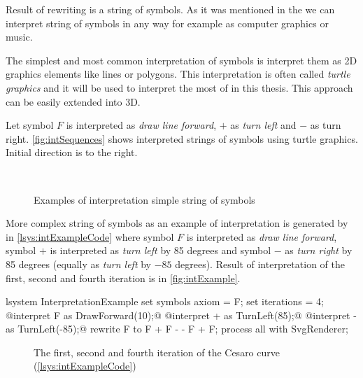 Result of \lsystem rewriting is a string of symbols.
As it was mentioned in the  we can interpret string of symbols in any way for example as computer graphics or music.

The simplest and most common interpretation of \lsystem symbols is interpret them as 2D graphics elements like lines or polygons.
This interpretation is often called \emph{turtle graphics} and it will be used to interpret the most of \lsystems in this thesis.
This approach can be easily extended into 3D.

Let symbol $F$ is interpreted as \emph{draw line forward}, $+$ as \emph{turn left} and $-$ as turn right.
\autoref{fig:intSequences} shows interpreted strings of symbols using turtle graphics.
Initial direction is to the right.

\begin{figure}[h]
	\centering
	 ~
	 ~
	\caption{Examples of interpretation simple string of symbols}
	\label{fig:intSequences}
\end{figure}


More complex string of symbols as an example of interpretation is generated by \lsystem in \autoref{lsys:intExampleCode} where symbol $F$ is interpreted as \emph{draw line forward},
	symbol $+$ is interpreted as \emph{turn left} by 85 degrees and symbol $-$ as \emph{turn right} by 85 degrees (equally as \emph{turn left} by $-85$ degrees).
Result of interpretation of the first, second and fourth iteration is in \autoref{fig:intExample}.

\begin{Lsystem}[label=lsys:intExampleCode,caption={Symbol interpretation example}]
lsystem InterpretationExample {
	set symbols axiom = F;
	set iterations = 4;
	@interpret F as DrawForward(10);@
	@interpret + as TurnLeft(85);@
	@interpret - as TurnLeft(-85);@
	rewrite F to F + F - - F + F;
}
process all with SvgRenderer;
\end{Lsystem}

\begin{figure}[h]
	 \hfill
	 \hfill
	\caption{The first, second and fourth iteration of the Cesaro curve (\autoref{lsys:intExampleCode})}
	\label{fig:intExample}
\end{figure}

